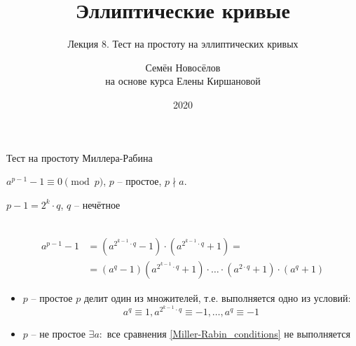 \documentclass{beamer}
\title{Эллиптические кривые}
\subtitle{Лекция 8. Тест на простоту на эллиптических кривых}
\author{Семён Новосёлов\\
\footnotesize{на основе курса Елены Киршановой}}
\institute{БФУ им. И. Канта}
\date{2020}
\begin{document}
\frame{\titlepage}


\begin{frame}{Тест на простоту Миллера-Рабина}%
\begin{center}
    \begin{tcolorbox}[enhanced,hbox,colback=title-and-section-color!5,colframe=title-and-section-color!120,title=Малая теорема Ферма,center title]
        \begin{varwidth}{\textwidth}
            \begin{center}
               $a^{p-1} - 1 \equiv 0 \pmod{p}$, $p$ -- простое, $p \nmid a$. 
            \end{center}
        \end{varwidth}
    \end{tcolorbox}	
\end{center}
\begin{center}
$p-1 = 2^k \cdot q$, $q$ -- нечётное\\
\structure{$\Downarrow$}\\
\end{center}
\begin{equation*}
\begin{split}
    a^{p-1} - 1 &= (a^{2^{k-1} \cdot q} - 1) \cdot (a^{2^{k-1} \cdot q} + 1) =\\&= (a^q - 1) (a^{2^{k-1} \cdot q} + 1) \cdot \ldots \cdot (a^{2 \cdot q} + 1) \cdot (a^q + 1)
\end{split}
\end{equation*}
\begin{itemize}
    \item $p$ -- простое \structure{$\implies$} $p$ делит один из множителей, т.е. выполняется одно из условий:
    \begin{equation}
        \label{Miller-Rabin_conditions}
        a^q \equiv 1, a^{2^{k-1} \cdot q} \equiv -1, \ldots, a^{q} \equiv -1
    \end{equation}
    \item $p$ -- не простое \structure{$\implies$} $\exists a:$ все сравнения  \eqref{Miller-Rabin_conditions} не выполняется
\end{itemize}
\end{frame}
\end{document}
